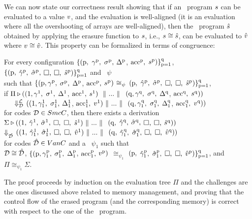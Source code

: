 We can now state our correctness result showing that if an \piccoC\ program $s$ can be evaluated  to a value $v$, and the evaluation is well-aligned (it is an evaluation where all the overshooting of arrays are well-aligned), then the \vanillaC\  program $\hat{s}$ obtained by applying the erasure function to $s$, i.e., $s\cong\hat{s}$, can be evaluated to $\hat{v}$ where $v\cong\hat{v}$. This property can be formalized in terms of congruence: 
%
%
\begin{theorem}[Correctness]
\label{Thm: erasure}
For every configuration $\{(\pid,\ \gamma^{{\pid}}_{},$ $\sigma^{{\mathrm{{p}}}}_{},$ $\Delta^{{\mathrm{{p}}}}_{}$, $\mathrm{acc}^{{\mathrm{{p}}}}_{},$ $s^{\mathrm{{p}}})\}^{\mathrm{{q}}}_{\mathrm{{p}} = \mathrm{{1}}}$, 
\\ $\{(\mathrm{{p}},$ $\hat{\gamma}^{\mathrm{{p}}},$ $\hat{\sigma}^{\mathrm{{p}}},$ $\Box,$ $\Box,$ $\hat{s}^{\mathrm{{p}}})\}^{\mathrm{{q}}}_{\mathrm{{p}} = \mathrm{{1}}}$ and \LocMap\ $\psi$ 
\\ such that $\{(\mathrm{{p}}, \gamma^{{\mathrm{{p}}}}_{},$ $\sigma^{{\mathrm{{p}}}}_{},$ $\Delta^{{\mathrm{{p}}}}_{}$, $\mathrm{acc}^{{\mathrm{{p}}}}_{},$ $s^{{\mathrm{{p}}}})$ $\cong_{\psi}$ 
$(\mathrm{{p}},$ $\hat{\gamma}^{\mathrm{{p}}},$ $\hat{\sigma}^{\mathrm{{p}}},$ $\Box,$ $\Box,$ $\hat{s}^{\mathrm{{p}}})\}^{\mathrm{{q}}}_{\mathrm{{p}} = \mathrm{{1}}}$, 
\\ %
if $\Pi \triangleright ((\mathrm{{1}}, \gamma^{{\mathrm{{1}}}}_{},$ $\sigma^{{\mathrm{{1}}}}_{},$ $\Delta^{{\mathrm{{1}}}}_{}$, $\mathrm{acc}^{{\mathrm{{1}}}}_{},$ $s^{{\mathrm{{1}}}})\ \-\ \Vert\  ...\-\ \Vert\ $ 
	$(\mathrm{{q}}, \gamma^{{\mathrm{{q}}}}_{},$ $\sigma^{{\mathrm{{q}}}}_{},$ $\Delta^{{\mathrm{{q}}}}_{}$, $\mathrm{acc}^{{\mathrm{{q}}}}_{},$ $s^{{\mathrm{{q}}}}))$ 
	\\ \-\ \-\ \-\ $\Downarrow^{\mathcal{L}}_\mathit{\mathcal{D}}$ 
	$((\mathrm{{1}}, {\gamma^{{\mathrm{{1}}}}_{1}},$ ${\sigma^{{\mathrm{{1}}}}_{1}},$ $\Delta^{{\mathrm{{1}}}}_{1}$, $\mathrm{acc}^{{\mathrm{{1}}}}_{1},$ ${v^{{\mathrm{{1}}}}_{}}) \-\ \Vert\  ... \-\ \Vert\ $ 
	$(\mathrm{{q}}, {\gamma^{{\mathrm{{q}}}}_{1}},$ ${\sigma^{{\mathrm{{q}}}}_{1}},$ $\Delta^{{\mathrm{{q}}}}_{1}$, $\mathrm{acc}^{{\mathrm{{q}}}}_{1},$ $v^{{\mathrm{{q}}}}))$ 
\\ for codes $\mathcal{D} \in {SmcC}$,
then there exists a derivation 
\\ %
$\Sigma \triangleright ((\mathrm{{1}},$ $\hat{\gamma}^{\mathrm{{1}}},$ $\hat{\sigma}^{\mathrm{{1}}},$ $\Box,$ $\Box,$ $\hat{s}^{\mathrm{{1}}})\-\ \Vert\  ...\-\ \Vert\  $
	$(\mathrm{{q}},$ $\hat{\gamma}^{\mathrm{{q}}},$ $\hat{\sigma}^{\mathrm{{q}}},$ $\Box,$ $\Box,$ $\hat{s}^{\mathrm{{q}}}))$ 
	\\ $\Downarrow^{}_\mathit{\hat{\mathcal{D}}}$ 
	$((\mathrm{{1}},$ $\hat{\gamma}^{\mathrm{{1}}}_1,$ $\hat{\sigma}^{\mathrm{{1}}}_1,$ $\Box,$ $\Box,$ $\hat{v}^{\mathrm{{1}}})\-\ \Vert\ ...\-\ \Vert\ $
	$(\mathrm{{q}},$ $\hat{\gamma}^{\mathrm{{q}}}_1,$ $\hat{\sigma}^{\mathrm{{q}}}_1,$ $\Box,$ $\Box,$ $\hat{v}^{\mathrm{{q}}}))$ 
\\ for codes $\hat{\mathcal{D}} \in VanC$ 
and 
a \LocMap\ $\psi_1$ 
such that 
\\ %
$\mathcal{D} \cong \hat{\mathcal{D}}$, 
$\{(\mathrm{{p}}, {\gamma^{{\mathrm{{p}}}}_{1}},$ ${\sigma^{{\mathrm{{p}}}}_{1}},$ $\Delta^{{\mathrm{{p}}}}_{1}$, $\mathrm{acc}^{{\mathrm{{p}}}}_{1},$ $v^{{\mathrm{{p}}}}_{})$ $\cong_{\psi_1}$ 
$(\mathrm{{p}},$ $\hat{\gamma}^{\mathrm{{p}}}_1,$ $\hat{\sigma}^{\mathrm{{p}}}_1,$ $\Box,$ $\Box,$ $\hat{v}^{\mathrm{{p}}})\}^{\mathrm{{q}}}_{\mathrm{{p}} = \mathrm{{1}}}$, 
and $\Pi \cong_{\psi_1} \Sigma$.
\end{theorem}
The proof 
proceeds by induction on the evaluation tree $\Pi$ and the challenges are the ones 
discussed above related to memory management, and proving that the control flow of the erased program (and the corresponding memory) is correct with respect to the one of the \piccoC\ program.
%
